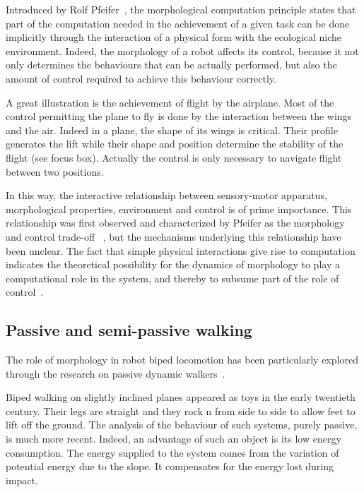 Introduced by Rolf Pfeifer~\parencite{pfeifer2005morphological}, the morphological computation principle states that part of the computation needed in the achievement of a given task can be done implicitly through the interaction of a physical form with the ecological niche environment.
Indeed, the morphology of a robot affects its control, because it not only determines the behaviours that can be actually performed, but also the amount of control required to achieve this behaviour correctly.

A great illustration is the achievement of flight by the airplane. Most of the control permitting the plane to fly is done by the interaction between the wings and the air. Indeed in a plane, the shape of its wings is critical. Their profile generates the lift while their shape and position determine the stability of the flight (see focus box). Actually the control is only necessary to navigate flight between two positions.

In this way, the interactive relationship between sensory-motor apparatus, morphological properties, environment and control is of prime importance. This relationship was first observed and characterized by Pfeifer as the morphology and control trade-off ~\parencite{pfeifer2001understanding}, but the mechanisms underlying this relationship have been unclear. The fact that simple physical interactions give rise to computation indicates the theoretical possibility for the dynamics of morphology to play a computational role in the system, and thereby to subsume part of the role of control~\parencite{paulinvestigation}.


\subsection{Passive and semi-passive walking} %

The role of morphology in robot biped locomotion has been particularly explored through the research on passive dynamic walkers~\parencite{wisse2007passive}.

Biped walking on slightly inclined planes appeared as toys in the early twentieth century. Their legs are straight and they rock n from side to side to allow feet to lift off the ground. The analysis of the behaviour of such systems, purely passive, is much more recent. Indeed, an advantage of such an object is its low energy consumption. The energy supplied to the system comes from the variation of potential energy due to the slope. It compensates for the energy lost during impact.

